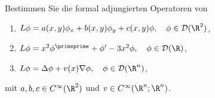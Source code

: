 
\begin{exercise}

Bestimmen Sie die formal adjungierten Operatoren von
\begin{enumerate}[label = (\roman*)]
  \item $L\phi = a(x,y)\phi_x + b(x,y)\phi_y + c(x,y)\phi, \quad \phi \in \mathcal{D}(\R^2)$,
  \item $L\phi = x^2\phi^{\primeprime} + \phi^{\prime} - 3x^2\phi, \quad \phi \in \mathcal{D}(\R)$,
  \item $L\phi = \Delta\phi + v(x)\nabla \phi, \quad \phi \in \mathcal{D}(\R^n)$,
\end{enumerate}
mit $a,b,c \in C^{\infty}(\R^2)$ und $v \in C^{\infty}(\R^n;\R^n)$.

\end{exercise}


\begin{solution}

\phantom{}

\end{solution}

